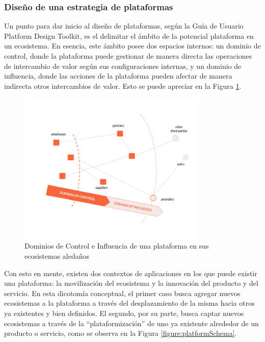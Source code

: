 \subsubsection{Diseño de una estrategia de plataformas}

Un punto para dar inicio al diseño de plataformas, según la Guía de Usuario Platform Design Toolkit,  es el delimitar el ámbito de la potencial plataforma en un ecosistema. En esencia, este ámbito posee dos espacios internos: un dominio de control, donde la plataforma puede gestionar de manera directa las operaciones de intercambio de valor según sus configuraciones internas, y un dominio de influencia, donde las acciones de la plataforma pueden afectar de manera indirecta otros intercambios de valor. Esto se puede apreciar en la Figura \ref{figure:platformDomain}.

\begin{figure}[H]
\centering
\includegraphics[width=0.80\textwidth]{img/3.png}
\caption{Dominios de Control e Influencia de una plataforma en sus ecosistemas aledaños \cite{boundarylessplatform}}
\label{figure:platformDomain}
\end{figure}

Con esto en mente, existen dos contextos de aplicaciones en los que puede existir una plataforma: la movilización del ecosistema y la innovación del producto y del servicio. En esta dicotomía conceptual, el primer caso busca agregar nuevos ecosistemas a la plataforma a través del desplazamiento de la misma hacia otros ya existentes y bien definidos. El segundo, por su parte, busca captar nuevos ecosistemas a través de la “plataformización” de uno ya existente alrededor de un producto o servicio, como se observa en la Figura \ref{figure:platformSchema}.


